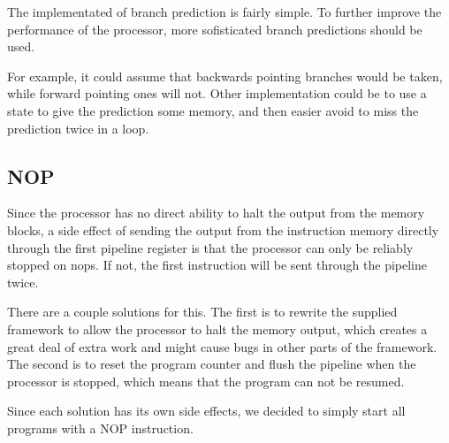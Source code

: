 The implementated of branch prediction is fairly simple. To further improve the
performance of the processor, more sofisticated branch predictions should be
used.

For example, it could assume that backwards pointing branches would be taken,
while forward pointing ones will not. Other implementation could be to use a
state to give the prediction some memory, and then easier avoid to miss the
prediction twice in a loop.

\subsection{NOP}

Since the processor has no direct ability to halt the output from the memory blocks, a side effect of sending the output from the instruction memory directly through the first pipeline register is that the processor can only be reliably stopped on nops.
If not, the first instruction will be sent through the pipeline twice.

There are a couple solutions for this.
The first is to rewrite the supplied framework to allow the processor to halt the memory output, which creates a great deal of extra work and might cause bugs in other parts of the framework.
The second is to reset the program counter and flush the pipeline when the processor is stopped, which means that the program can not be resumed.

Since each solution has its own side effects, we decided to simply start all
programs with a NOP instruction.

